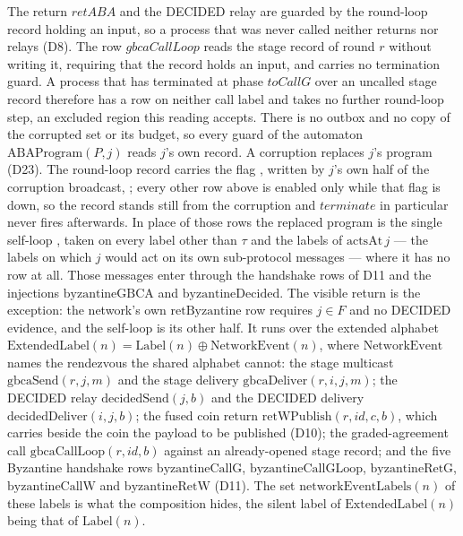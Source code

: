 \begin{definition}
  The return $retABA$ and the DECIDED relay are guarded by the round-loop record holding an input, so a process that was never called neither returns nor relays (D8).
  The row $gbcaCallLoop$ reads the stage record of round $r$ without writing it, requiring that the record holds an input, and carries no termination guard.
  A process that has terminated at phase $toCallG$ over an uncalled stage record therefore has a row on neither call label and takes no further round-loop step, an excluded region this reading accepts.
  There is no outbox and no copy of the corrupted set or its budget, so every guard of the automaton $\mathrm{ABAProgram}(P,j)$ reads $j$'s own record.
  A corruption replaces $j$'s program (D23).
  The round-loop record carries the flag , written by $j$'s own half of the corruption broadcast, ; every other row above is enabled only while that flag is down, so the record stands still from the corruption and $terminate$ in particular never fires afterwards.
  In place of those rows the replaced program is the single self-loop , taken on every label other than $\tau$ and the labels of $\mathrm{actsAt}\,j$ --- the labels on which $j$ would act on its own sub-protocol messages --- where it has no row at all.
  Those messages enter through the handshake rows of D11 and the injections $\mathrm{byzantineGBCA}$ and $\mathrm{byzantineDecided}$.
  The visible return is the exception: the network's own $\mathrm{retByzantine}$ row requires $j \in F$ and no DECIDED evidence, and the self-loop is its other half.
  It runs over the extended alphabet $\mathrm{ExtendedLabel}(n) = \mathrm{Label}(n) \oplus \mathrm{NetworkEvent}(n)$, where $\mathrm{NetworkEvent}$ names the rendezvous the shared alphabet cannot: the stage multicast $\mathrm{gbcaSend}(r,j,m)$ and the stage delivery $\mathrm{gbcaDeliver}(r,i,j,m)$; the DECIDED relay $\mathrm{decidedSend}(j,b)$ and the DECIDED delivery $\mathrm{decidedDeliver}(i,j,b)$; the fused coin return $\mathrm{retWPublish}(r,id,c,b)$, which carries beside the coin the payload to be published (D10); the graded-agreement call $\mathrm{gbcaCallLoop}(r,id,b)$ against an already-opened stage record; and the five Byzantine handshake rows $\mathrm{byzantineCallG}$, $\mathrm{byzantineCallGLoop}$, $\mathrm{byzantineRetG}$, $\mathrm{byzantineCallW}$ and $\mathrm{byzantineRetW}$ (D11).
  The set $\mathrm{networkEventLabels}(n)$ of these labels is what the composition hides, the silent label of $\mathrm{ExtendedLabel}(n)$ being that of $\mathrm{Label}(n)$.

\end{definition}
